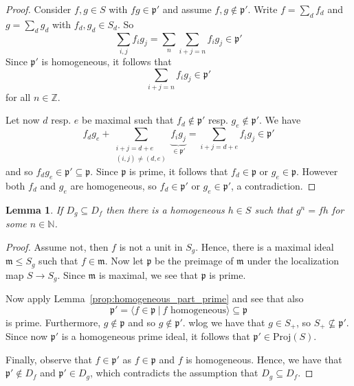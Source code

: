 \documentclass{scrartcl}
\newcommand{\N}{\mathbb{N}}
\newcommand{\Z}{\mathbb{Z}}
\newcommand{\p}{\mathfrak{p}}
\newcommand{\m}{\mathfrak{m}}
\renewcommand{\m}{\mathfrak{m}}
\newcommand{\Proj}{\mathrm{Proj}}
\newtheorem{lemma}[prop]{Lemma}
\theoremstyle{definition}
\begin{document}
\begin{proof}
    Consider $f, g \in S$ with $f g \in \p'$ and assume $f, g \notin \p'$.
    Write $f = \sum_d f_d$ and $g = \sum_d g_d$ with $f_d, g_d \in S_d$.
    So
    \begin{equation*}
        \sum_{i, j} f_i g_j = \sum_n \sum_{i + j = n} f_i g_j \in \p'
    \end{equation*}
    Since $\p'$ is homogeneous, it follows that
    \begin{equation*}
        \sum_{i + j = n} f_i g_j \in \p'
    \end{equation*}
    for all $n \in \Z$.

    Let now $d$ resp. $e$ be maximal such that $f_d \notin \p'$ resp. $g_e \notin \p'$.
    We have
    \begin{equation*}
        f_d g_e + \sum_{\substack{i + j = d + e\\(i, j) \neq (d, e)}} \underbrace{f_i g_j}_{\in \p'} = \sum_{i + j = d + e} f_i g_j \in \p'
    \end{equation*}
    and so $f_d g_e \in \p' \subseteq \p$.
    Since $\p$ is prime, it follows that $f_d \in \p$ or $g_e \in \p$.
    However both $f_d$ and $g_e$ are homogeneous, so $f_d \in \p'$ or $g_e \in \p'$, a contradiction.
\end{proof}
\begin{lemma}
    If $D_g \subseteq D_f$ then there is a homogeneous $h \in S$ such that $g^n = fh$ for some $n \in \N$.
\end{lemma}
\begin{proof}
    Assume not, then $f$ is not a unit in $S_g$.
    Hence, there is a maximal ideal $\m \leq S_g$ such that $f \in \m$.
    Now let $\p$ be the preimage of $\m$ under the localization map $S \to S_g$.
    Since $\m$ is maximal, we see that $\p$ is prime.

    Now apply Lemma~\ref{prop:homogeneous_part_prime} and see that also
    \begin{equation*}
        \p' = \langle f \in \p \ | \ \text{$f$ homogeneous} \rangle \subseteq \p
    \end{equation*}
    is prime.
    Furthermore, $g \notin \p$ and so $g \notin \p'$.
    wlog we have that $g \in S_+$, so $S_+ \not\subseteq \p'$.
    Since now $\p'$ is a homogeneous prime ideal, it follows that $\p' \in \Proj(S)$.

    Finally, observe that $f \in \p'$ as $f \in \p$ and $f$ is homogeneous.
    Hence, we have that $\p' \notin D_f$ and $\p' \in D_g$, which contradicts the assumption that $D_g \subseteq D_f$.
\end{proof}
\end{document}
